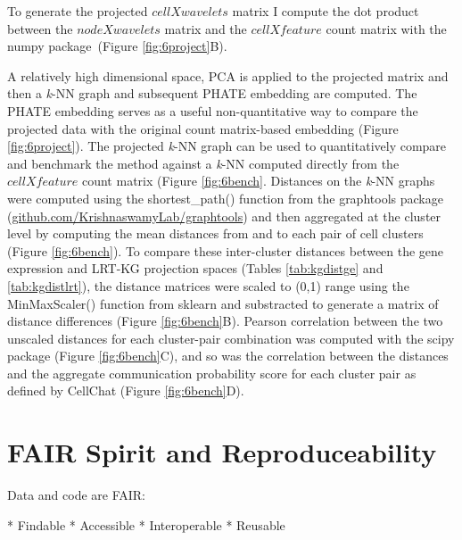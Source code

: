 To generate the projected \(cell X wavelets\) matrix I compute the dot product between the \(node X wavelets\) matrix and the \(cell X feature\) count matrix with the numpy package~\cite{harris_array_2020}(Figure \ref{fig:6project}B).

A relatively high dimensional space, PCA is applied to the projected matrix and then a \emph{k}-NN graph and subsequent PHATE embedding are computed. The PHATE embedding serves as a useful non-quantitative way to compare the projected data with the original count matrix-based embedding (Figure \ref{fig:6project}).
The projected \emph{k}-NN graph can be used to quantitatively compare and benchmark the method against a \emph{k}-NN computed directly from the \(cell X feature\) count matrix (Figure \ref{fig:6bench}. Distances on the \emph{k}-NN graphs were computed using the shortest\_path() function from the graphtools package (\url{github.com/KrishnaswamyLab/graphtools}) and then aggregated at the cluster level by computing the mean distances from and to each pair of cell clusters (Figure \ref{fig:6bench}). To compare these inter-cluster distances between the gene expression and LRT-KG projection spaces (Tables \ref{tab:kgdistge} and \ref{tab:kgdistlrt}), the distance matrices were scaled to (0,1) range using the MinMaxScaler() function from sklearn and substracted to generate a matrix of distance differences (Figure \ref{fig:6bench}B). Pearson correlation between the two unscaled distances for each cluster-pair combination was computed with the scipy package (Figure \ref{fig:6bench}C), and so was the correlation between the distances and the aggregate communication probability score for each cluster pair as defined by CellChat (Figure \ref{fig:6bench}D). 




\section{FAIR Spirit and Reproduceability}

Data and code are FAIR:

* Findable
* Accessible
* Interoperable
* Reusable


